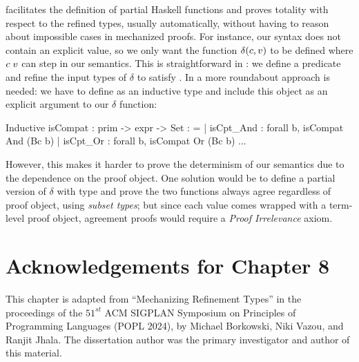 \lh facilitates the definition of partial Haskell functions 
and proves totality with respect to the refined types,
usually automatically, without 
having to reason about impossible cases in mechanized proofs.
%
For instance, our syntax does not contain an explicit 
 value, so we only want the function
$\delta(c,v)$ to be defined where ${c}\;{v}$ can 
step in our semantics.
%
This is straightforward in \lh: we define a predicate 
 and refine the input
types of $\delta$ to satisfy .
%
%
In \coq a more roundabout approach is needed: we have to define 
 as an inductive type and include this object as
an explicit argument to our $\delta$ function:
%
\begin{mcode}
  Inductive isCompat : prim -> expr -> Set : =   
    | isCpt_And  : forall b, isCompat And (Bc b)
    | isCpt_Or   : forall b, isCompat Or  (Bc b) 
    ...
\end{mcode}
%
However, this makes it harder to prove the determinism of our
semantics due to the dependence on the proof object. 
%
One solution would be to define a partial version of 
$\delta$ with type
 and prove the two functions
always agree regardless of proof object, \eg using \emph{subset types};
but since  each value
comes wrapped with a term-level proof object,
agreement proofs would require a \emph{Proof Irrelevance} axiom.
%


\section*{Acknowledgements for Chapter 8}
%
This chapter is adapted from 
``Mechanizing Refinement Types'' in the proceedings of the 
$51^{st}$ ACM SIGPLAN Symposium on Principles of Programming
Languages (POPL 2024), by Michael Borkowski, Niki Vazou, and
Ranjit Jhala.
%
The dissertation author was the primary investigator 
and author of this material.
